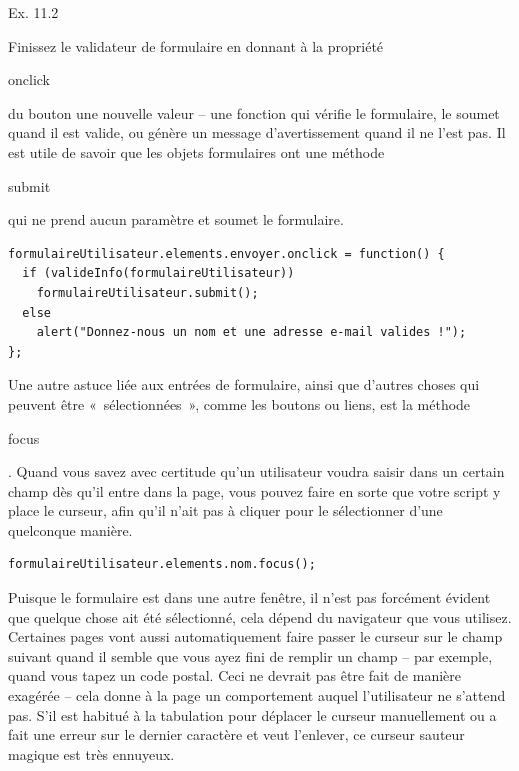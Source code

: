 \documentclass{FramateX}
\renewcommand{\texttt}[1]{\begin{sffamily}{#1}\end{sffamily}}
\begin{document}
\begin{center}\end{center}

Ex. 11.2

Finissez le validateur de formulaire en donnant à la propriété
\texttt{onclick} du bouton une nouvelle valeur -- une fonction qui
vérifie le formulaire, le soumet quand il est valide, ou génère un
message d'avertissement quand il ne l'est pas. Il est utile de savoir
que les objets formulaires ont une méthode \texttt{submit} qui ne prend
aucun paramètre et soumet le formulaire.

\begin{lstlisting}
formulaireUtilisateur.elements.envoyer.onclick = function() {
  if (valideInfo(formulaireUtilisateur))
    formulaireUtilisateur.submit();
  else
    alert("Donnez-nous un nom et une adresse e-mail valides !");
};
\end{lstlisting}
\begin{center}\end{center}

Une autre astuce liée aux entrées de formulaire, ainsi que d'autres
choses qui peuvent être «~sélectionnées~», comme les boutons ou liens,
est la méthode \texttt{focus}. Quand vous savez avec certitude qu'un
utilisateur voudra saisir dans un certain champ dès qu'il entre dans la
page, vous pouvez faire en sorte que votre script y place le curseur,
afin qu'il n'ait pas à cliquer pour le sélectionner d'une quelconque
manière.

\begin{lstlisting}
formulaireUtilisateur.elements.nom.focus();
\end{lstlisting}
Puisque le formulaire est dans une autre fenêtre, il n'est pas forcément
évident que quelque chose ait été sélectionné, cela dépend du navigateur
que vous utilisez. Certaines pages vont aussi automatiquement faire
passer le curseur sur le champ suivant quand il semble que vous ayez
fini de remplir un champ -- par exemple, quand vous tapez un code postal.
Ceci ne devrait pas être fait de manière exagérée -- cela donne à la page
un comportement auquel l'utilisateur ne s'attend pas. S'il est habitué à
la tabulation pour déplacer le curseur manuellement ou a fait une erreur
sur le dernier caractère et veut l'enlever, ce curseur sauteur magique
est très ennuyeux.

\begin{center}\end{center}
\end{document}
